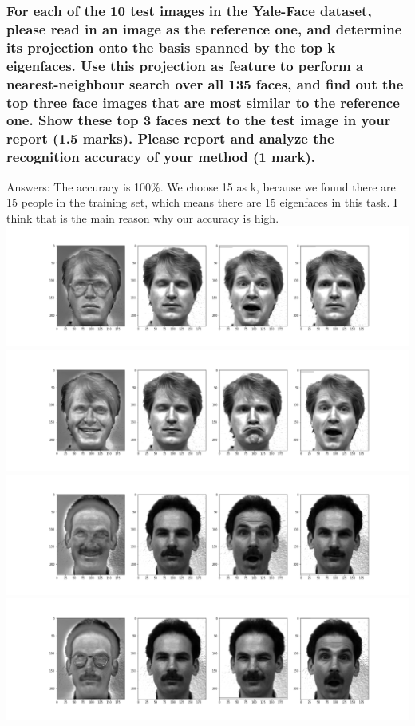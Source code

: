 \documentclass[]{article}
\begin{document}
\subsubsection{For each of the 10 test images in the Yale-Face dataset, please read in an image as the reference one, and determine its projection onto the basis spanned by the top k eigenfaces. Use this projection as feature to perform a nearest-neighbour search over all 135 faces, and find out the top three face images that are most similar to the reference one. Show these top 3 faces next to the test image in your report (1.5 marks). Please report and analyze the recognition accuracy of your method (1 mark).}
Answers: The  accuracy is 100\%. We choose 15 as k, because we found there are 15 people in the training set, which means there are 15 eigenfaces in this task. I think that is the main reason why our accuracy is high.\\
\includegraphics[width=15cm]{1top3.png}
\includegraphics[width=15cm]{2top3.png}
\includegraphics[width=15cm]{3top3.png}
\includegraphics[width=15cm]{4top3.png}
\end{document}
